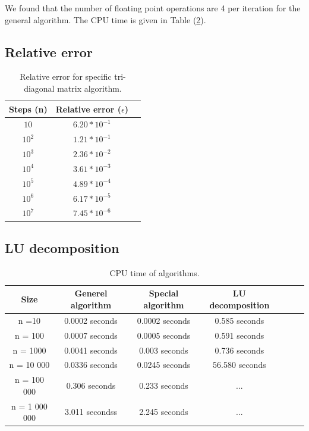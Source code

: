 \documentclass[norsk,a4paper,12pt]{article}
\begin{document}
We found that the number of floating point operations are 4 per iteration for the general algorithm. The CPU time is given in Table (\ref{tab:LU}).

 \subsection{Relative error}
 
  \begin{table}[H]
\begin{center}
\caption{Relative error for specific tri-diagonal matrix algorithm.}
\begin{tabular}{ |c|c|c| } \hline
Steps (n)&Relative error ($\epsilon$) \\ \hline
$10$&$6.20*10^{-1}$ \\ \hline
$10^2$&$1.21*10^{-1}$ \\ \hline
$10^3$&$2.36*10^{-2}$ \\ \hline
$10^4$&$3.61*10^{-3}$ \\ \hline
$10^5$&$4.89*10^{-4}$ \\ \hline
$10^6$&$6.17*10^{-5}$ \\ \hline
$10^7$&$7.45*10^{-6}$ \\ \hline
\end{tabular}
\label{tab:e}
\end{center}
\end{table}

 \subsection{LU decomposition}
 
   \begin{table}[H]
\begin{center}
\caption{CPU time of algorithms.}
\begin{tabular}{ |c|c|c|clcl } \hline
Size & Generel algorithm& Special algorithm& LU decomposition \\ \hline
n =10 & 0.0002 seconds &0.0002 seconds&0.585 seconds\\ \hline
n = 100 & 0.0007 seconds   &0.0005  seconds& 0.591 seconds\\ \hline
n = 1000 &0.0041 seconds &0.003 seconds& 0.736 seconds\\ \hline
n = 10 000    &0.0336 seconds&0.0245  seconds&56.580 seconds\\ \hline
n = 100 000& 0.306 seconds &0.233 seconds& ...\\ \hline
n = 1 000 000 & 3.011 secondss &2.245 seconds&...\\ \hline
\end{tabular}
\label{tab:LU}
\end{center}
\end{table}
\end{document}
